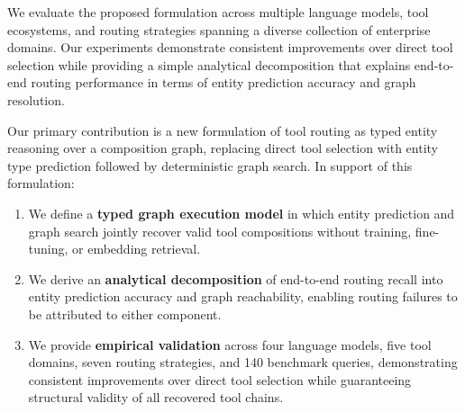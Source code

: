 We evaluate the proposed formulation across multiple language models, tool ecosystems, and routing strategies spanning a diverse collection of enterprise domains. Our experiments demonstrate consistent improvements over direct tool selection while providing a simple analytical decomposition that explains end-to-end routing performance in terms of entity prediction accuracy and graph resolution.

Our primary contribution is a new formulation of tool routing as typed entity reasoning over a composition graph, replacing direct tool selection with entity type prediction followed by deterministic graph search.
In support of this formulation:

\begin{enumerate}

\item We define a \textbf{typed graph execution model} in which entity prediction and graph search jointly recover valid tool compositions without training, fine-tuning, or embedding retrieval.

\item We derive an \textbf{analytical decomposition} of end-to-end routing recall into entity prediction accuracy and graph reachability, enabling routing failures to be attributed to either component.

\item We provide \textbf{empirical validation} across four language models, five tool domains, seven routing strategies, and 140 benchmark queries, demonstrating consistent improvements over direct tool selection while guaranteeing structural validity of all recovered tool chains.

\end{enumerate}
